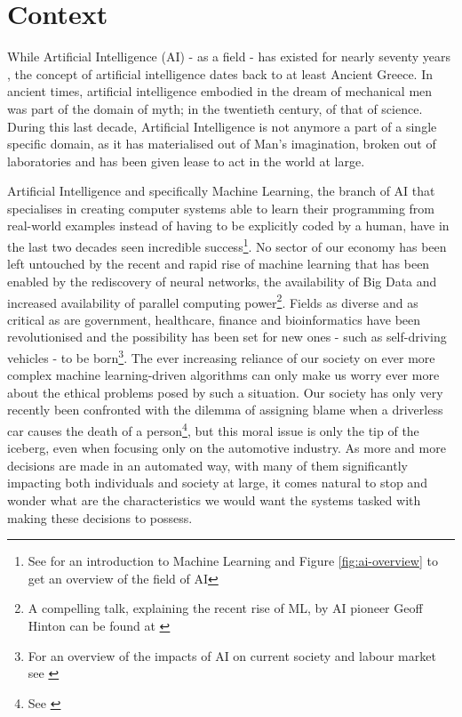 \section{Context} \label{sec:intro-context}
While Artificial Intelligence (AI) - as a field - has existed for nearly seventy years \citep{moor2006dartmouth}, the concept of artificial intelligence dates back to at least Ancient Greece.  
In ancient times, artificial intelligence embodied in the dream of mechanical men was part of the domain of myth; in the twentieth century, of that of science.  
During this last decade, Artificial Intelligence is not anymore a part of a single specific domain, as it has materialised out of Man's imagination, broken out of laboratories and has been given lease to act in the world at large.

Artificial Intelligence and specifically Machine Learning, the branch of AI that specialises in creating computer systems able to learn their programming from real-world examples instead of having to be explicitly coded by a human, have in the last two decades seen incredible success\footnote{See \citet{shalev2014understanding} for an introduction to Machine Learning and Figure \ref{fig:ai-overview} to get an overview of the field of AI}.
No sector of our economy has been left untouched by the recent and rapid rise of machine learning that has been enabled by the rediscovery of neural networks, the availability of Big Data and increased availability of parallel computing power\footnote{A compelling talk, explaining the recent rise of ML, by AI pioneer Geoff Hinton can be found at \citet{hintonmachinelearning}}.
Fields as diverse and as critical as are government, healthcare, finance and bioinformatics have been revolutionised and the possibility has been set for new ones - such as self-driving vehicles - to be born\footnote{For an overview of the impacts of AI on current society and labour market see \citet{schwab2017fourth}}.
The ever increasing reliance of our society on ever more complex machine learning-driven algorithms can only make us worry ever more about the ethical problems posed by such a situation.  
Our society has only very recently been confronted with the dilemma of assigning blame when a driverless car causes the death of a person\footnote{See \citet{uberkillspedestrian}}, but this moral issue is only the tip of the iceberg, even when focusing only on the automotive industry.  
As more and more decisions are made in an automated way, with many of them significantly impacting both individuals and society at large, it comes natural to stop and wonder what are the characteristics we would want the systems tasked with making these decisions to possess.  

